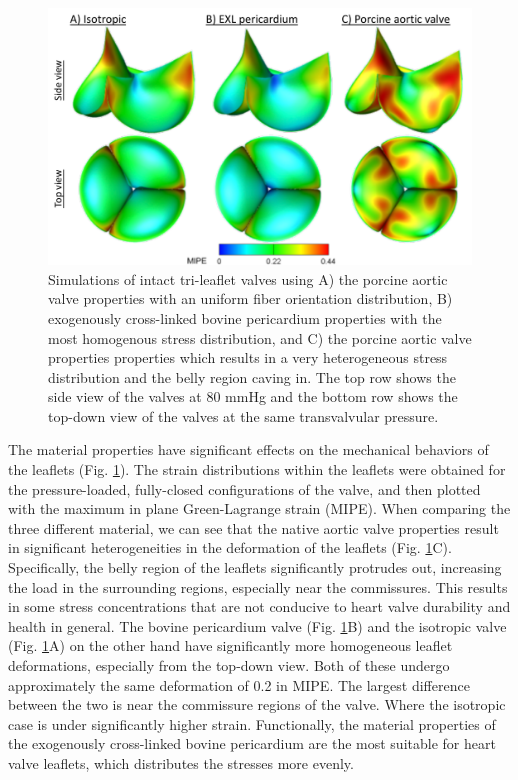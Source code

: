 	
\begin{figure}
\centering
\includegraphics[width=\textwidth]{Images/chapter5/valvesimulations}
\caption{Simulations of intact tri-leaflet valves using A) the porcine aortic valve properties with an uniform fiber orientation distribution, B) exogenously cross-linked bovine pericardium properties with the most homogenous stress distribution, and C) the porcine aortic valve properties properties which results in a very heterogeneous stress distribution and the belly region caving in. The top row shows the side view of the valves at 80 mmHg and the bottom row shows the top-down view of the valves at the same transvalvular pressure.}
\label{fig:valvesimulations}
\end{figure}
    
    The material properties have significant effects on the mechanical behaviors of the leaflets (Fig. \ref{fig:valvesimulations}). The strain distributions within the leaflets were obtained for the pressure-loaded, fully-closed configurations of the valve, and then plotted with the maximum in plane Green-Lagrange strain (MIPE). When comparing the three different material, we can see that the native aortic valve properties result in significant heterogeneities in the deformation of the leaflets (Fig. \ref{fig:valvesimulations}C). Specifically, the belly region of the leaflets significantly protrudes out, increasing the load in the surrounding regions, especially near the commissures. This results in some stress concentrations that are not conducive to heart valve durability and health in general. The bovine pericardium valve (Fig. \ref{fig:valvesimulations}B) and the isotropic valve (Fig. \ref{fig:valvesimulations}A) on the other hand have significantly more homogeneous leaflet deformations, especially from the top-down view. Both of these undergo approximately the same deformation of 0.2 in MIPE. The largest difference between the two is near the commissure regions of the valve. Where the isotropic case is under significantly higher strain. Functionally, the material properties of the exogenously cross-linked bovine pericardium are the most suitable for heart valve leaflets, which distributes the stresses more evenly. 
    
